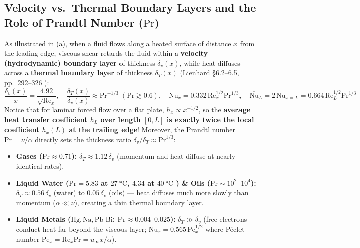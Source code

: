 \subsection{Velocity vs.\ Thermal Boundary Layers and the Role of Prandtl Number ($\mathrm{Pr}$)}
As illustrated in (a), when a fluid flows along a heated surface of distance $x$ from the leading edge, viscous shear retards the fluid within a \textbf{velocity (hydrodynamic) boundary layer} of thickness $\delta_v(x)$, while heat diffuses across a \textbf{thermal boundary layer} of thickness $\delta_T(x)$ (Lienhard §6.2--6.5, pp.~292--326 ):
\begin{equation}
  \frac{\delta_v(x)}{x} = \frac{4.92}{\sqrt{\mathrm{Re}_x}}, \quad \frac{\delta_T(x)}{\delta_v(x)} \approx \mathrm{Pr}^{-1/3}\ (\mathrm{Pr} \gtrsim 0.6), \quad \mathrm{Nu}_x = 0.332\,\mathrm{Re}_x^{1/2}\mathrm{Pr}^{1/3}, \quad \overline{\mathrm{Nu}}_L = 2\,\mathrm{Nu}_{x=L} = 0.664\,\mathrm{Re}_L^{1/2}\mathrm{Pr}^{1/3}
  \label{eq:11:blasius-pohlhausen}
\end{equation}
Notice that for laminar forced flow over a flat plate, $h_x \propto x^{-1/2}$, so the \textbf{average heat transfer coefficient $\bar{h}_L$ over length $[0, L]$ is exactly twice the local coefficient $h_x(L)$ at the trailing edge}! Moreover, the Prandtl number $\mathrm{Pr} = \nu/\alpha$ directly sets the thickness ratio $\delta_v/\delta_T \approx \mathrm{Pr}^{1/3}$:
\begin{itemize}
  \item \textbf{Gases ($\mathrm{Pr} \approx 0.71$):} $\delta_T \approx 1.12\,\delta_v$ (momentum and heat diffuse at nearly identical rates).
  \item \textbf{Liquid Water ($\mathrm{Pr} = 5.83$ at $\SI{27}{\celsius}$, $4.34$ at $\SI{40}{\celsius}$ ) \& Oils ($\mathrm{Pr} \sim 10^2\text{--}10^4$):} $\delta_T \approx 0.56\,\delta_v$ (water) to $0.05\,\delta_v$ (oils) — heat diffuses much more slowly than momentum ($\alpha \ll \nu$), creating a thin thermal boundary layer.
  \item \textbf{Liquid Metals ($\mathrm{Hg}, \mathrm{Na}, \mathrm{Pb\text{-}Bi}$: $\mathrm{Pr} \approx 0.004\text{--}0.025$):} $\delta_T \gg \delta_v$ (free electrons conduct heat far beyond the viscous layer; $\mathrm{Nu}_x = 0.565\,\mathrm{Pe}_x^{1/2}$ where P\'eclet number $\mathrm{Pe}_x = \mathrm{Re}_x\mathrm{Pr} = u_\infty x/\alpha$).
\end{itemize}

